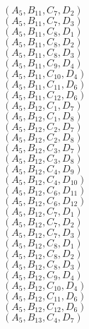 \documentclass[14pt]{article}
\begin{document}
    $({A}_{5}, {B}_{11}, {C}_{7}, {D}_{2}) $ \\ 
    $({A}_{5}, {B}_{11}, {C}_{7}, {D}_{3}) $ \\ 
    $({A}_{5}, {B}_{11}, {C}_{8}, {D}_{1}) $ \\ 
    $({A}_{5}, {B}_{11}, {C}_{8}, {D}_{2}) $ \\ 
    $({A}_{5}, {B}_{11}, {C}_{8}, {D}_{3}) $ \\ 
    $({A}_{5}, {B}_{11}, {C}_{9}, {D}_{4}) $ \\ 
    $({A}_{5}, {B}_{11}, {C}_{10}, {D}_{4}) $ \\ 
    $({A}_{5}, {B}_{11}, {C}_{11}, {D}_{6}) $ \\ 
    $({A}_{5}, {B}_{11}, {C}_{12}, {D}_{6}) $ \\ 
    $({A}_{5}, {B}_{12}, {C}_{1}, {D}_{7}) $ \\ 
    $({A}_{5}, {B}_{12}, {C}_{1}, {D}_{8}) $ \\ 
    $({A}_{5}, {B}_{12}, {C}_{2}, {D}_{7}) $ \\ 
    $({A}_{5}, {B}_{12}, {C}_{2}, {D}_{8}) $ \\ 
    $({A}_{5}, {B}_{12}, {C}_{3}, {D}_{7}) $ \\ 
    $({A}_{5}, {B}_{12}, {C}_{3}, {D}_{8}) $ \\ 
    $({A}_{5}, {B}_{12}, {C}_{4}, {D}_{9}) $ \\ 
    $({A}_{5}, {B}_{12}, {C}_{4}, {D}_{10}) $ \\ 
    $({A}_{5}, {B}_{12}, {C}_{6}, {D}_{11}) $ \\ 
    $({A}_{5}, {B}_{12}, {C}_{6}, {D}_{12}) $ \\ 
    $({A}_{5}, {B}_{12}, {C}_{7}, {D}_{1}) $ \\ 
    $({A}_{5}, {B}_{12}, {C}_{7}, {D}_{2}) $ \\ 
    $({A}_{5}, {B}_{12}, {C}_{7}, {D}_{3}) $ \\ 
    $({A}_{5}, {B}_{12}, {C}_{8}, {D}_{1}) $ \\ 
    $({A}_{5}, {B}_{12}, {C}_{8}, {D}_{2}) $ \\ 
    $({A}_{5}, {B}_{12}, {C}_{8}, {D}_{3}) $ \\ 
    $({A}_{5}, {B}_{12}, {C}_{9}, {D}_{4}) $ \\ 
    $({A}_{5}, {B}_{12}, {C}_{10}, {D}_{4}) $ \\ 
    $({A}_{5}, {B}_{12}, {C}_{11}, {D}_{6}) $ \\ 
    $({A}_{5}, {B}_{12}, {C}_{12}, {D}_{6}) $ \\ 
    $({A}_{5}, {B}_{13}, {C}_{4}, {D}_{7}) $ \\ 
\end{document}
